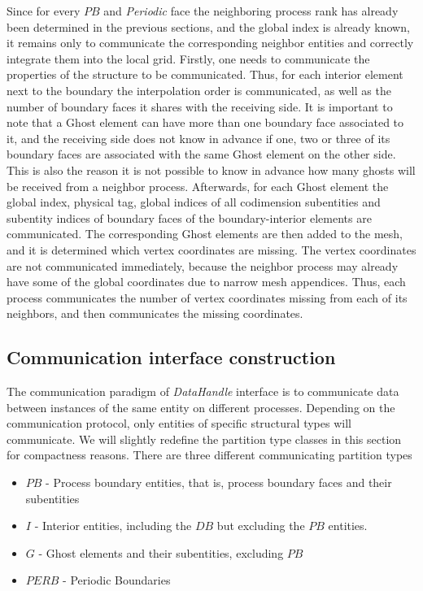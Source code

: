 \noindent
Since for every $PB$ and \textit{Periodic} face the neighboring process rank has already been determined in the previous sections, and the global index is already known, it remains only to communicate the corresponding neighbor entities and correctly integrate them into the local grid. Firstly, one needs to communicate the properties of the structure to be communicated. Thus, for each interior element next to the boundary the interpolation order is communicated, as well as the number of boundary faces it shares with the receiving side. It is important to note that a Ghost element can have more than one boundary face associated to it, and the receiving side does not know in advance if one, two or three of its boundary faces are associated with the same Ghost element on the other side. This is also the reason it is not possible to know in advance how many ghosts will be received from a neighbor process. Afterwards, for each Ghost element the global index, physical tag, global indices of all codimension subentities and subentity indices of boundary faces of the boundary-interior elements are communicated. The corresponding Ghost elements are then added to the mesh, and it is determined which vertex coordinates are missing. The vertex coordinates are not communicated immediately, because the neighbor process may already have some of the global coordinates due to narrow mesh appendices. Thus, each process communicates the number of vertex coordinates missing from each of its neighbors, and then communicates the missing coordinates.




\subsection{Communication interface construction}
\label{impl-grid-constructor-comm}

The communication paradigm of \dune{} \textit{DataHandle} interface is to communicate data between instances of the same entity on different processes. Depending on the communication protocol, only entities of specific structural types will communicate. We will slightly redefine the partition type classes in this section for compactness reasons. There are three different communicating partition types
\begin{itemize}
	\item $PB$ - Process boundary entities, that is, process boundary faces and their subentities
	\item $I$ - Interior entities, including the $DB$ but excluding the $PB$ entities.
	\item $G$ - Ghost elements and their subentities, excluding $PB$
	\item $PERB$ - Periodic Boundaries
\end{itemize}


